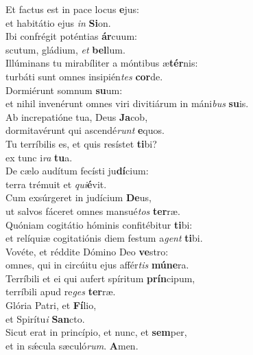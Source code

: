 \evenverse Et factus est in pace locus \textbf{e}jus:~\*\\
\evenverse et habitátio ejus \textit{in} \textbf{Si}on.\\
\oddverse Ibi confrégit poténtias \textbf{ár}cuum:~\*\\
\oddverse scutum, gládium, \textit{et} \textbf{bel}lum.\\
\evenverse Illúminans tu mirabíliter a móntibus æ\textbf{tér}nis:~\*\\
\evenverse turbáti sunt omnes insipién\textit{tes} \textbf{cor}de.\\
\oddverse Dormiérunt somnum \textbf{su}um:~\*\\
\oddverse et nihil invenérunt omnes viri divitiárum in máni\textit{bus} \textbf{su}is.\\
\evenverse Ab increpatióne tua, Deus \textbf{Ja}cob,~\*\\
\evenverse dormitavérunt qui ascendé\textit{runt} \textbf{e}quos.\\
\oddverse Tu terríbilis es, et quis resístet \textbf{ti}bi?~\*\\
\oddverse ex tunc i\textit{ra} \textbf{tu}a.\\
\evenverse De cælo audítum fecísti ju\textbf{dí}cium:~\*\\
\evenverse terra trémuit et \textit{qui}\textbf{é}vit.\\
\oddverse Cum exsúrgeret in judícium \textbf{De}us,~\*\\
\oddverse ut salvos fáceret omnes mansué\textit{tos} \textbf{ter}ræ.\\
\evenverse Quóniam cogitátio hóminis confitébitur \textbf{ti}bi:~\*\\
\evenverse et relíquiæ cogitatiónis diem festum a\textit{gent} \textbf{ti}bi.\\
\oddverse Vovéte, et réddite Dómino Deo \textbf{ve}stro:~\*\\
\oddverse omnes, qui in circúitu ejus affér\textit{tis} \textbf{mú}\textbf{ne}ra.\\
\evenverse Terríbili et ei qui aufert spíritum \textbf{prín}cipum,~\*\\
\evenverse terríbili apud re\textit{ges} \textbf{ter}ræ.\\
\oddverse Glória Patri, et \textbf{Fí}lio,~\*\\
\oddverse et Spirítu\textit{i} \textbf{San}cto.\\
\evenverse Sicut erat in princípio, et nunc, et \textbf{sem}per,~\*\\
\evenverse et in sǽcula sæculó\textit{rum}. \textbf{A}men.\\
